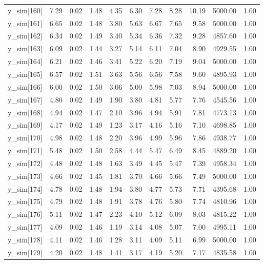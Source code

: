 \begin{table}[ht]
\begin{tabular}{rrrrrrrrrrr}
  y\_sim[160] & 7.29 & 0.02 & 1.48 & 4.35 & 6.30 & 7.28 & 8.28 & 10.19 & 5000.00 & 1.00 \\ 
  y\_sim[161] & 6.65 & 0.02 & 1.48 & 3.80 & 5.63 & 6.67 & 7.65 & 9.58 & 5000.00 & 1.00 \\ 
  y\_sim[162] & 6.34 & 0.02 & 1.49 & 3.40 & 5.34 & 6.36 & 7.32 & 9.28 & 4857.60 & 1.00 \\ 
  y\_sim[163] & 6.09 & 0.02 & 1.44 & 3.27 & 5.14 & 6.11 & 7.04 & 8.90 & 4929.55 & 1.00 \\ 
  y\_sim[164] & 6.21 & 0.02 & 1.46 & 3.41 & 5.22 & 6.20 & 7.19 & 9.04 & 5000.00 & 1.00 \\ 
  y\_sim[165] & 6.57 & 0.02 & 1.51 & 3.63 & 5.56 & 6.56 & 7.58 & 9.60 & 4895.93 & 1.00 \\ 
  y\_sim[166] & 6.00 & 0.02 & 1.50 & 3.06 & 5.00 & 5.98 & 7.03 & 8.94 & 5000.00 & 1.00 \\ 
  y\_sim[167] & 4.80 & 0.02 & 1.49 & 1.90 & 3.80 & 4.81 & 5.77 & 7.76 & 4545.56 & 1.00 \\ 
  y\_sim[168] & 4.94 & 0.02 & 1.47 & 2.10 & 3.96 & 4.94 & 5.91 & 7.81 & 4773.13 & 1.00 \\ 
  y\_sim[169] & 4.17 & 0.02 & 1.49 & 1.23 & 3.17 & 4.16 & 5.16 & 7.10 & 4698.85 & 1.00 \\ 
  y\_sim[170] & 4.98 & 0.02 & 1.48 & 2.20 & 3.96 & 4.99 & 5.96 & 7.86 & 4938.77 & 1.00 \\ 
  y\_sim[171] & 5.48 & 0.02 & 1.50 & 2.58 & 4.44 & 5.47 & 6.49 & 8.45 & 4889.20 & 1.00 \\ 
  y\_sim[172] & 4.48 & 0.02 & 1.48 & 1.63 & 3.49 & 4.45 & 5.47 & 7.39 & 4958.34 & 1.00 \\ 
  y\_sim[173] & 4.66 & 0.02 & 1.45 & 1.81 & 3.70 & 4.66 & 5.66 & 7.49 & 5000.00 & 1.00 \\ 
  y\_sim[174] & 4.78 & 0.02 & 1.48 & 1.94 & 3.80 & 4.77 & 5.73 & 7.71 & 4395.68 & 1.00 \\ 
  y\_sim[175] & 4.79 & 0.02 & 1.48 & 1.91 & 3.78 & 4.76 & 5.80 & 7.74 & 4810.96 & 1.00 \\ 
  y\_sim[176] & 5.11 & 0.02 & 1.47 & 2.23 & 4.10 & 5.12 & 6.09 & 8.03 & 4815.22 & 1.00 \\ 
  y\_sim[177] & 4.09 & 0.02 & 1.46 & 1.19 & 3.14 & 4.08 & 5.07 & 7.00 & 4995.11 & 1.00 \\ 
  y\_sim[178] & 4.11 & 0.02 & 1.46 & 1.28 & 3.11 & 4.09 & 5.11 & 6.99 & 5000.00 & 1.00 \\ 
  y\_sim[179] & 4.20 & 0.02 & 1.48 & 1.41 & 3.17 & 4.19 & 5.20 & 7.17 & 4835.58 & 1.00 \\ 

\end{tabular}
\end{table}
